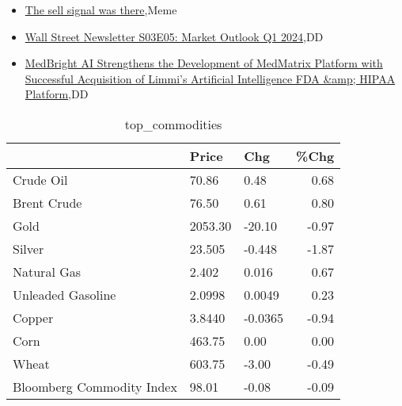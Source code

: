 \documentclass{article}%
\begin{document}
%
\begin{itemize}%
\item%
\href{https://reddit.com/r/wallstreetbets/comments/18xi0z6/the\_sell\_signal\_was\_there/}{The sell signal was there},Meme%
\item%
\href{https://reddit.com/r/wallstreetbets/comments/18xe8ss/wall\_street\_newsletter\_s03e05\_market\_outlook\_q1/}{Wall Street Newsletter S03E05: Market Outlook Q1 2024},DD%
\item%
\href{https://reddit.com/r/Baystreetbets/comments/18x59h0/medbright\_ai\_strengthens\_the\_development\_of/}{MedBright AI Strengthens the Development of MedMatrix Platform with Successful Acquisition of Limmi's Artificial Intelligence FDA \&amp; HIPAA Platform},DD%
\end{itemize}%


\begin{table}[htbp]%
\caption{top\_commodities}%
\centering%
\begin{adjustbox}{width=1\textwidth}%
\begin{tabular}{lllr}
\toprule
                          &   Price &     Chg &  \%Chg \\
\midrule
               Crude Oil  &   70.86 &    0.48 &  0.68 \\
             Brent Crude  &   76.50 &    0.61 &  0.80 \\
                    Gold  & 2053.30 &  -20.10 & -0.97 \\
                  Silver  &  23.505 &  -0.448 & -1.87 \\
             Natural Gas  &   2.402 &   0.016 &  0.67 \\
       Unleaded Gasoline  &  2.0998 &  0.0049 &  0.23 \\
                  Copper  &  3.8440 & -0.0365 & -0.94 \\
                    Corn  &  463.75 &    0.00 &  0.00 \\
                   Wheat  &  603.75 &   -3.00 & -0.49 \\
Bloomberg Commodity Index &   98.01 &   -0.08 & -0.09 \\
\bottomrule
\end{tabular}
%
\end{adjustbox}%
\end{table}

%
\end{document}

